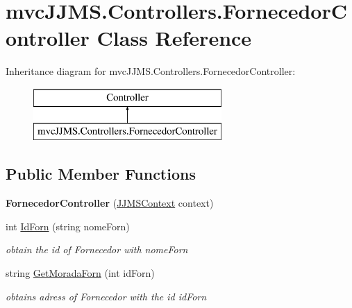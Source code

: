 \hypertarget{classmvc_j_j_m_s_1_1_controllers_1_1_fornecedor_controller}{}\section{mvc\+J\+J\+M\+S.\+Controllers.\+Fornecedor\+Controller Class Reference}
\label{classmvc_j_j_m_s_1_1_controllers_1_1_fornecedor_controller}
Inheritance diagram for mvc\+J\+J\+M\+S.\+Controllers.\+Fornecedor\+Controller\+:\begin{figure}[H]
\begin{center}
\leavevmode
\includegraphics[height=2.000000cm]{classmvc_j_j_m_s_1_1_controllers_1_1_fornecedor_controller}
\end{center}
\end{figure}
\subsection*{Public Member Functions}
\begin{DoxyCompactItemize}
\item 
\mbox{\label{classmvc_j_j_m_s_1_1_controllers_1_1_fornecedor_controller_ad52283ae0d089a077433d7427fbe18f6}} 
{\bfseries Fornecedor\+Controller} (\mbox{\hyperlink{classmvc_j_j_m_s_1_1_data_1_1_j_j_m_s_context}{J\+J\+M\+S\+Context}} context)
\item 
int \mbox{\hyperlink{classmvc_j_j_m_s_1_1_controllers_1_1_fornecedor_controller_aff86c90ff49596167a21019cc0666de9}{Id\+Forn}} (string nome\+Forn)
\begin{DoxyCompactList}\small\item\em obtain the id of Fornecedor with nome\+Forn \end{DoxyCompactList}\item 
string \mbox{\hyperlink{classmvc_j_j_m_s_1_1_controllers_1_1_fornecedor_controller_a2f7a5b563e072a228f1b9fe5da68afb4}{Get\+Morada\+Forn}} (int id\+Forn)
\begin{DoxyCompactList}\small\item\em obtains adress of Fornecedor with the id id\+Forn \end{DoxyCompactList}\end{DoxyCompactItemize}


